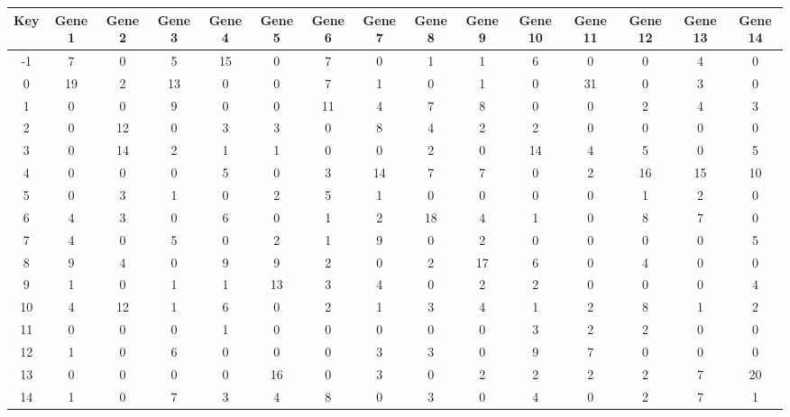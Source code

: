\begin{tabular}{|c|c|c|c|c|c|c|c|c|c|c|c|c|c|c|}
\hline
Key & Gene 1 & Gene 2 & Gene 3 & Gene 4 & Gene 5 & Gene 6 & Gene 7 & Gene 8 & Gene 9 & Gene 10 & Gene 11 & Gene 12 & Gene 13 & Gene 14 \\
\hline
-1 & 7 & 0 & 5 & 15 & 0 & 7 & 0 & 1 & 1 & 6 & 0 & 0 & 4 & 0 \\
0 & 19 & 2 & 13 & 0 & 0 & 7 & 1 & 0 & 1 & 0 & 31 & 0 & 3 & 0 \\
1 & 0 & 0 & 9 & 0 & 0 & 11 & 4 & 7 & 8 & 0 & 0 & 2 & 4 & 3 \\
2 & 0 & 12 & 0 & 3 & 3 & 0 & 8 & 4 & 2 & 2 & 0 & 0 & 0 & 0 \\
3 & 0 & 14 & 2 & 1 & 1 & 0 & 0 & 2 & 0 & 14 & 4 & 5 & 0 & 5 \\
4 & 0 & 0 & 0 & 5 & 0 & 3 & 14 & 7 & 7 & 0 & 2 & 16 & 15 & 10 \\
5 & 0 & 3 & 1 & 0 & 2 & 5 & 1 & 0 & 0 & 0 & 0 & 1 & 2 & 0 \\
6 & 4 & 3 & 0 & 6 & 0 & 1 & 2 & 18 & 4 & 1 & 0 & 8 & 7 & 0 \\
7 & 4 & 0 & 5 & 0 & 2 & 1 & 9 & 0 & 2 & 0 & 0 & 0 & 0 & 5 \\
8 & 9 & 4 & 0 & 9 & 9 & 2 & 0 & 2 & 17 & 6 & 0 & 4 & 0 & 0 \\
9 & 1 & 0 & 1 & 1 & 13 & 3 & 4 & 0 & 2 & 2 & 0 & 0 & 0 & 4 \\
10 & 4 & 12 & 1 & 6 & 0 & 2 & 1 & 3 & 4 & 1 & 2 & 8 & 1 & 2 \\
11 & 0 & 0 & 0 & 1 & 0 & 0 & 0 & 0 & 0 & 3 & 2 & 2 & 0 & 0 \\
12 & 1 & 0 & 6 & 0 & 0 & 0 & 3 & 3 & 0 & 9 & 7 & 0 & 0 & 0 \\
13 & 0 & 0 & 0 & 0 & 16 & 0 & 3 & 0 & 2 & 2 & 2 & 2 & 7 & 20 \\
14 & 1 & 0 & 7 & 3 & 4 & 8 & 0 & 3 & 0 & 4 & 0 & 2 & 7 & 1 \\
\hline
\end{tabular}
